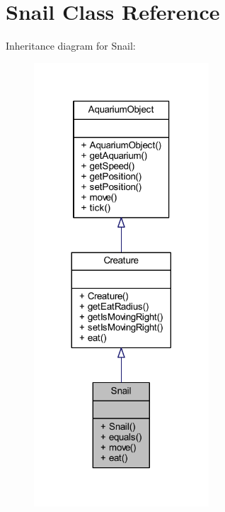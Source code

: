 \hypertarget{class_snail}{}\section{Snail Class Reference}
\label{class_snail}


Inheritance diagram for Snail\+:
\nopagebreak
\begin{figure}[H]
\begin{center}
\leavevmode
\includegraphics[width=185pt]{class_snail__inherit__graph}
\end{center}
\end{figure}


